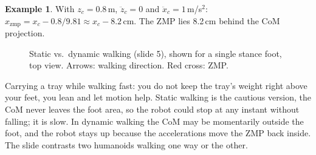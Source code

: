 \documentclass[11pt,a4paper]{article}
\newcommand{\com}[1]{\begin{scope}[shift={(#1)}]\draw[fill=white,thick] (0,0) circle (0.13);
  \fill (0,0) -- (0.13,0) arc (0:90:0.13) -- cycle;
  \fill (0,0) -- (-0.13,0) arc (180:270:0.13) -- cycle;\end{scope}}
\newcommand{\zmpmark}[1]{\begin{scope}[shift={(#1)}]\draw[red!70!black,very thick]
  (-0.12,-0.12)--(0.12,0.12) (-0.12,0.12)--(0.12,-0.12);\end{scope}}
\theoremstyle{definition}
\newtheorem{example}[definition]{Example}
\theoremstyle{plain}
\newtheorem{proposition}[definition]{Proposition}
\theoremstyle{remark}
\begin{document}

\begin{example}
With $z_c=0.8$\,m, $\ddot z_c=0$ and $\ddot x_c=1$\,m/s$^2$: $x_{\mathrm{zmp}}=x_c-0.8/9.81\approx x_c-8.2$\,cm. The ZMP lies 8.2\,cm behind the CoM projection.
\end{example}

\begin{figure}[H]
\centering
{}
\caption{Static vs.\ dynamic walking (slide 5), shown for a single stance foot, top view. Arrows: walking direction. Red cross: ZMP.}
\end{figure}

\begin{intuition}
Carrying a tray while walking fast: you do not keep the tray's weight right above your feet, you lean and let motion help. Static walking is the cautious version, the CoM never leaves the foot area, so the robot could stop at any instant without falling; it is slow. In dynamic walking the CoM may be momentarily outside the foot, and the robot stays up because the accelerations move the ZMP back inside. The slide contrasts two humanoids walking one way or the other.
\end{intuition}
\end{document}
